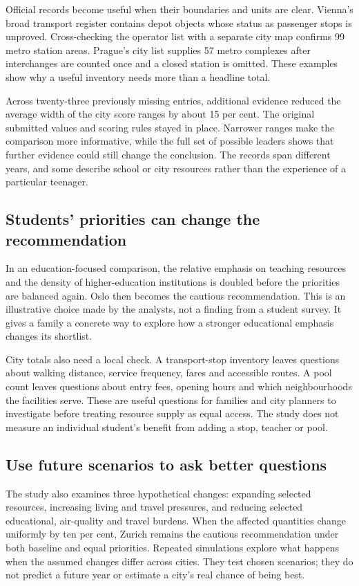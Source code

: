 Official records become useful when their boundaries and units are clear. Vienna's broad transport register contains depot objects whose status as passenger stops is unproved. Cross-checking the operator list with a separate city map confirms 99 metro station areas. Prague's city list supplies 57 metro complexes after interchanges are counted once and a closed station is omitted. These examples show why a useful inventory needs more than a headline total.

Across twenty-three previously missing entries, additional evidence reduced the average width of the city score ranges by about 15 per cent. The original submitted values and scoring rules stayed in place. Narrower ranges make the comparison more informative, while the full set of possible leaders shows that further evidence could still change the conclusion. The records span different years, and some describe school or city resources rather than the experience of a particular teenager.

\newpage
\subsection*{Students' priorities can change the recommendation}

In an education-focused comparison, the relative emphasis on teaching resources and the density of higher-education institutions is doubled before the priorities are balanced again. Oslo then becomes the cautious recommendation. This is an illustrative choice made by the analysts, not a finding from a student survey. It gives a family a concrete way to explore how a stronger educational emphasis changes its shortlist.

City totals also need a local check. A transport-stop inventory leaves questions about walking distance, service frequency, fares and accessible routes. A pool count leaves questions about entry fees, opening hours and which neighbourhoods the facilities serve. These are useful questions for families and city planners to investigate before treating resource supply as equal access. The study does not measure an individual student's benefit from adding a stop, teacher or pool.

\subsection*{Use future scenarios to ask better questions}

The study also examines three hypothetical changes: expanding selected resources, increasing living and travel pressures, and reducing selected educational, air-quality and travel burdens. When the affected quantities change uniformly by ten per cent, Zurich remains the cautious recommendation under both baseline and equal priorities. Repeated simulations explore what happens when the assumed changes differ across cities. They test chosen scenarios; they do not predict a future year or estimate a city's real chance of being best.

